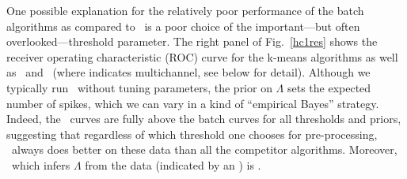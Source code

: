 One possible explanation for the relatively poor performance of the batch algorithms as compared to \smug\ is a poor choice of the important---but often overlooked---threshold parameter.  The right panel of Fig.\ \ref{hc1res} shows the receiver operating characteristic (ROC) curve for the k-means algorithms as well as \smug\ and \smug\ (where  indicates multichannel, see below for detail).  Although we typically run \smug\ without tuning parameters, the prior on $\Lambda$ sets the expected number of spikes, which we can vary in a kind of ``empirical Bayes'' strategy.  Indeed, the \smug\ curves are fully above the batch curves for all thresholds and priors, suggesting that regardless of which threshold one chooses for pre-processing, \smug\ always does better on these data than all the competitor algorithms.  Moreover, \smug\ which infers $\Lambda$ from the data (indicated by an ) is .

